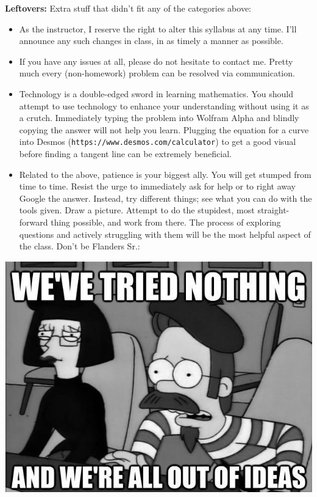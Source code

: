 \documentclass[12pt]{amsbook}
\begin{document}
\textbf{Leftovers:} Extra stuff that didn't fit any of the categories above:
\begin{itemize}
\item[] As the instructor, I reserve the right to alter this syllabus at any time. I'll announce any such changes in class, in as timely a manner as possible.
\item[] If you have any issues at all, please do not hesitate to contact me. Pretty much every (non-homework) problem can be resolved via communication.
\item[] Technology is a double-edged sword in learning mathematics. You should attempt to use technology to enhance your understanding without using it as a crutch. Immediately typing the problem into Wolfram Alpha and blindly copying the answer will not help you learn. Plugging the equation for a curve into Desmos (\texttt{https://www.desmos.com/calculator}) to get a good visual before finding a tangent line can be extremely beneficial.
\item[] Related to the above, patience is your biggest ally. You will get stumped from time to time. Resist the urge to immediately ask for help or to right away Google the answer. Instead, try different things; see what you can do with the tools given. Draw a picture. Attempt to do the stupidest, most straight-forward thing possible, and work from there. The process of exploring questions and actively struggling with them will be the most helpful aspect of the class. Don't be Flanders Sr.:
\end{itemize}
\begin{center}\includegraphics[scale=.65]{triednothing.jpg}\end{center}
\end{document}
